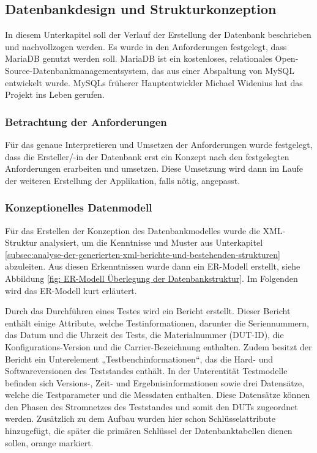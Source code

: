 \subsection{Datenbankdesign und Strukturkonzeption}
\label{subsec:datenbankdesign-und-strukturkonzeption}

In diesem Unterkapitel soll der Verlauf der Erstellung der Datenbank beschrieben und nachvollzogen werden. Es wurde in
den Anforderungen festgelegt, dass MariaDB genutzt werden soll. MariaDB ist ein kostenloses, relationales
Open-Source-Datenbankmanagementsystem, das aus einer Abspaltung von MySQL entwickelt wurde. MySQLs früherer
Hauptentwickler Michael Widenius hat das Projekt ins Leben gerufen. \cite{mariadb.org}

\subsubsection{Betrachtung der Anforderungen}

Für das genaue Interpretieren und Umsetzen der Anforderungen wurde festgelegt, dass die Ersteller/-in der Datenbank erst
ein Konzept nach den festgelegten Anforderungen erarbeiten und umsetzen.
Diese Umsetzung wird dann im Laufe der weiteren Erstellung der Applikation, falls nötig, angepasst.

\subsubsection{Konzeptionelles Datenmodell}

Für das Erstellen der Konzeption des Datenbankmodelles wurde die XML-Struktur analysiert, um die Kenntnisse und Muster
aus Unterkapitel \ref{subsec:analyse-der-generierten-xml-berichte-und-bestehenden-strukturen} abzuleiten.
Aus diesen Erkenntnissen wurde dann ein ER-Modell erstellt, siehe Abbildung \ref{fig: ER-Modell Überlegung der Datenbankstruktur}.
Im Folgenden wird das ER-Modell kurt erläutert.

Durch das Durchführen eines Testes wird ein Bericht erstellt. Dieser Bericht enthält einige Attribute, welche
Testinformationen, darunter die Seriennummern, das Datum und die Uhrzeit des Tests, die Materialnummer (DUT-ID), die
Konfigurations-Version und die Carrier-Bezeichnung enthalten. Zudem besitzt der Bericht ein Unterelement „Testbenchinformationen“, das die Hard- und Softwareversionen des Teststandes enthält. In der Unterentität Testmodelle
befinden sich Versions-, Zeit- und Ergebnisinformationen sowie drei Datensätze, welche die Testparameter und die Messdaten
enthalten. Diese Datensätze können den Phasen des Stromnetzes des Teststandes und somit den DUTs zugeordnet werden.
Zusätzlich zu dem Aufbau wurden hier schon Schlüsselattribute hinzugefügt, die später die primären Schlüssel der
Datenbanktabellen dienen sollen, orange markiert.

